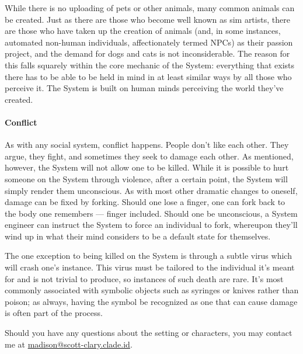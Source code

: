 While there is no uploading of pets or other animals, many common animals can be created. Just as there are those who become well known as sim artists, there are those who have taken up the creation of animals (and, in some instances, automated non-human individuals, affectionately termed NPCs) as their passion project, and the demand for dogs and cats is not inconsiderable. The reason for this falls squarely within the core mechanic of the System: everything that exists there has to be able to be held in mind in at least similar ways by all those who perceive it. The System is built on human minds perceiving the world they've created.

\paragraph{Conflict}

As with any social system, conflict happens. People don't like each other. They argue, they fight, and sometimes they seek to damage each other. As mentioned, however, the System will not allow one to be killed. While it is possible to hurt someone on the System through violence, after a certain point, the System will simply render them unconscious. As with most other dramatic changes to oneself, damage can be fixed by forking. Should one lose a finger, one can fork back to the body one remembers --- finger included. Should one be unconscious, a System engineer can instruct the System to force an individual to fork, whereupon they'll wind up in what their mind considers to be a default state for themselves.

The one exception to being killed on the System is through a subtle virus which will crash one's instance. This virus must be tailored to the individual it's meant for and is not trivial to produce, so instances of such death are rare. It's most commonly associated with symbolic objects such as syringes or knives rather than poison; as always, having the symbol be recognized as one that can cause damage is often part of the process.

\secdiv

\noindent Should you have any questions about the setting or characters, you may contact me at \href{mailto:mscottclary@clade.id}{madison@scott-clary.clade.id}.
